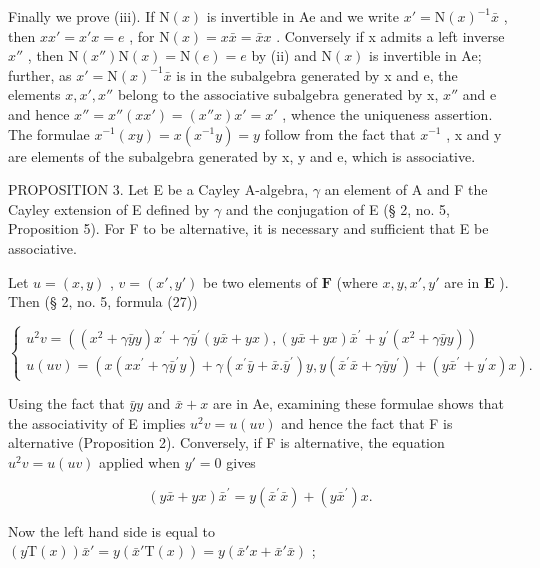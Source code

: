 Finally we prove (iii). If \(\mathrm{N}(x)\) is invertible in Ae and we write \(x' = \mathrm{N}(x)^{-1}\bar{x}\) , then \(xx' = x'x = e\) , for \(\mathrm{N}(x) = x\bar{x} = \bar{x}x\) . Conversely if x admits a left inverse \(x''\) , then \(\mathrm{N}(x'')\mathrm{N}(x) = \mathrm{N}(e) = e\) by (ii) and \(\mathrm{N}(x)\) is invertible in Ae; further, as \(x' = \mathrm{N}(x)^{-1}\bar{x}\) is in the subalgebra generated by x and e, the elements \(x, x', x''\) belong to the associative subalgebra generated by x, \(x''\) and e and hence \(x'' = x''(xx') = (x''x)x' = x'\) , whence the uniqueness assertion. The formulae \(x^{-1}(xy) = x(x^{-1}y) = y\) follow from the fact that \(x^{-1}\) , x and y are elements of the subalgebra generated by x, y and e, which is associative.

PROPOSITION 3. Let E be a Cayley A-algebra, \(\gamma\) an element of A and F the Cayley extension of E defined by \(\gamma\) and the conjugation of E (§ 2, no. 5, Proposition 5). For F to be alternative, it is necessary and sufficient that E be associative.

Let \(u = (x, y)\) , \(v = (x', y')\) be two elements of \(\mathbf{F}\) (where \(x, y, x', y'\) are in \(\mathbf{E}\) ). Then (§ 2, no. 5, formula (27))

\[
\left\{ \begin{array}{l} u ^ {2} v = ((x ^ {2} + \gamma \bar {y} y) x ^ {\prime} + \gamma \bar {y} ^ {\prime} (y \bar {x} + y x), (y \bar {x} + y x) \bar {x} ^ {\prime} + y ^ {\prime} (x ^ {2} + \gamma \bar {y} y)) \\ u (u v) = (x (x x ^ {\prime} + \gamma \bar {y} ^ {\prime} y) + \gamma (x ^ {\prime} \bar {y} + \bar {x}. \bar {y} ^ {\prime}) y, y (\bar {x} ^ {\prime} \bar {x} + \gamma \bar {y} y ^ {\prime}) + (y \bar {x} ^ {\prime} + y ^ {\prime} x) x). \end{array} \right.\tag{3}
\]

Using the fact that \(\bar{y}y\) and \(\bar{x} + x\) are in Ae, examining these formulae shows that the associativity of E implies \(u^{2}v = u(uv)\) and hence the fact that F is alternative (Proposition 2). Conversely, if F is alternative, the equation \(u^{2}v = u(uv)\) applied when \(y' = 0\) gives

\[
(y \bar {x} + y x) \bar {x} ^ {\prime} = y (\bar {x} ^ {\prime} \bar {x}) + (y \bar {x} ^ {\prime}) x.
\]

Now the left hand side is equal to \((y\mathrm{T}(x))\bar{x}' = y(\bar{x}'\mathrm{T}(x)) = y(\bar{x}'x + \bar{x}'\bar{x})\) ;

